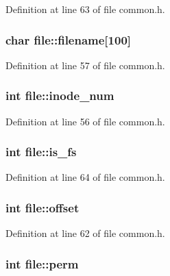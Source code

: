 Definition at line 63 of file common.\+h.

\subsubsection[{\texorpdfstring{filename}{filename}}]{\setlength{\rightskip}{0pt plus 5cm}char file\+::filename\mbox{[}100\mbox{]}}\hypertarget{structfile_ad45e3551765b38ecf4598ee9b06c796f}{}\label{structfile_ad45e3551765b38ecf4598ee9b06c796f}


Definition at line 57 of file common.\+h.

\subsubsection[{\texorpdfstring{inode\+\_\+num}{inode_num}}]{\setlength{\rightskip}{0pt plus 5cm}int file\+::inode\+\_\+num}\hypertarget{structfile_a3786bd6e6b62b6a56d906c4ab40f0648}{}\label{structfile_a3786bd6e6b62b6a56d906c4ab40f0648}


Definition at line 56 of file common.\+h.

\subsubsection[{\texorpdfstring{is\+\_\+fs}{is_fs}}]{\setlength{\rightskip}{0pt plus 5cm}int file\+::is\+\_\+fs}\hypertarget{structfile_a3161116c6ac521cfa3514f02c88b8d65}{}\label{structfile_a3161116c6ac521cfa3514f02c88b8d65}


Definition at line 64 of file common.\+h.

\subsubsection[{\texorpdfstring{offset}{offset}}]{\setlength{\rightskip}{0pt plus 5cm}int file\+::offset}\hypertarget{structfile_ad056d2081f3cab9ed4668689a02acaaf}{}\label{structfile_ad056d2081f3cab9ed4668689a02acaaf}


Definition at line 62 of file common.\+h.

\subsubsection[{\texorpdfstring{perm}{perm}}]{\setlength{\rightskip}{0pt plus 5cm}int file\+::perm}\hypertarget{structfile_ad094e8384225dee8ae9b4258745c30f9}{}\label{structfile_ad094e8384225dee8ae9b4258745c30f9}


